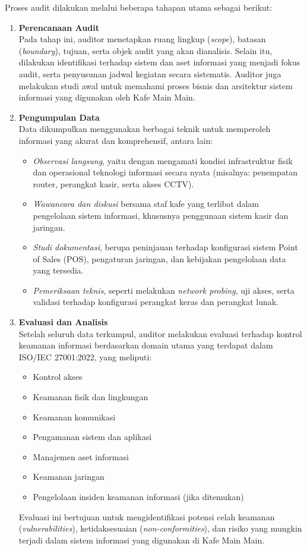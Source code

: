 \documentclass[12pt, a4paper]{report}
\begin{document}
Proses audit dilakukan melalui beberapa tahapan utama sebagai berikut:

\begin{enumerate}
    \item \textbf{Perencanaan Audit} \\
    Pada tahap ini, auditor menetapkan ruang lingkup (\textit{scope}), batasan (\textit{boundary}), tujuan, serta objek audit yang akan dianalisis. Selain itu, dilakukan identifikasi terhadap sistem dan aset informasi yang menjadi fokus audit, serta penyusunan jadwal kegiatan secara sistematis. Auditor juga melakukan studi awal untuk memahami proses bisnis dan arsitektur sistem informasi yang digunakan oleh Kafe Main Main.
    
    \item \textbf{Pengumpulan Data} \\
    Data dikumpulkan menggunakan berbagai teknik untuk memperoleh informasi yang akurat dan komprehensif, antara lain:
    \begin{itemize}
        \item \textit{Observasi langsung}, yaitu dengan mengamati kondisi infrastruktur fisik dan operasional teknologi informasi secara nyata (misalnya: penempatan router, perangkat kasir, serta akses CCTV).
        \item \textit{Wawancara dan diskusi} bersama staf kafe yang terlibat dalam pengelolaan sistem informasi, khususnya penggunaan sistem kasir dan jaringan.
        \item \textit{Studi dokumentasi}, berupa peninjauan terhadap konfigurasi sistem Point of Sales (POS), pengaturan jaringan, dan kebijakan pengelolaan data yang tersedia.
        \item \textit{Pemeriksaan teknis}, seperti melakukan \textit{network probing}, uji akses, serta validasi terhadap konfigurasi perangkat keras dan perangkat lunak.
    \end{itemize}
    
    \item \textbf{Evaluasi dan Analisis} \\
    Setelah seluruh data terkumpul, auditor melakukan evaluasi terhadap kontrol keamanan informasi berdasarkan domain utama yang terdapat dalam ISO/IEC 27001:2022, yang meliputi:
    \begin{itemize}
        \item Kontrol akses
        \item Keamanan fisik dan lingkungan
        \item Keamanan komunikasi
        \item Pengamanan sistem dan aplikasi
        \item Manajemen aset informasi
        \item Keamanan jaringan
        \item Pengelolaan insiden keamanan informasi (jika ditemukan)
    \end{itemize}
    Evaluasi ini bertujuan untuk mengidentifikasi potensi celah keamanan (\textit{vulnerabilities}), ketidaksesuaian (\textit{non-conformities}), dan risiko yang mungkin terjadi dalam sistem informasi yang digunakan di Kafe Main Main.


\end{enumerate}
\end{document}
